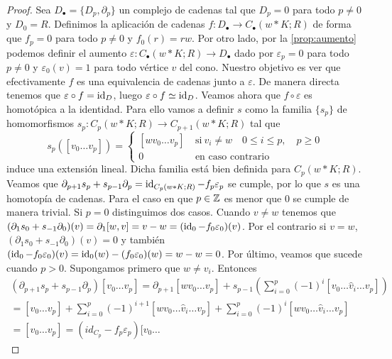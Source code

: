 \begin{proof}
	Sea \(D_{\bullet}= \{D_{p}, \partial_{p}\}\) un complejo de cadenas tal que \(D_{p}
	= 0\) para todo \(p \neq 0\) y \(D_{0}= R\). Definimos la aplicación de cadenas
	\(f: D_{\bullet}\to C_{\bullet}(w \ast K;R)\) de forma que \(f_{p}= 0\) para todo
	\(p \neq 0\) y \(f_{0}(r)=rw\). Por otro lado, por la \autoref{prop:aumento}
	podemos definir el aumento
	\(\varepsilon: C_{\bullet}(w \ast K;R) \to D_{\bullet}\) dado por
	\(\varepsilon_{p}=0\) para todo \(p \neq 0\) y \(\varepsilon_{0}(v) = 1\) para todo
	vértice \(v\) del cono. Nuestro objetivo es ver que efectivamente \(f\) es una equivalencia
	de cadenas junto a \(\varepsilon\). De manera directa tenemos que
	\(\varepsilon \circ f = \operatorname{id}_{D}\), luego \(\varepsilon \circ f \simeq \operatorname{id}_{D}\).
	Veamos ahora que \(f \circ \varepsilon\) es homotópica a la identidad. Para ello
	vamos a definir \(s\) como la familia \(\{s_{p}\}\) de homomorfismos \(s_{p}: C_{p}(
	w \ast K;R) \to C_{p+1}(w \ast K;R)\) tal que
	\[
	s_{p}([v_{0}\ldots v_{p}]) =
	\begin{cases}
		[wv_{0}\ldots v_{p}] \  & \text{si}\ v_{i}\neq w \quad 0 \leq i \leq p,\quad p \geq 0 \\
		0 \                     & \text{en caso contrario}
	\end{cases}
	\]
	induce una extensión lineal. Dicha familia está bien definida para
	\(C_{p}(w \ast K;R)\). Veamos que \(\partial_{p+1}s_{p}+ s_{p-1}\partial_{p}= \operatorname{id}_{C_p(w
		\ast K;R)}- f_{p}\varepsilon_{p}\) se cumple, por lo que \(s\) es una homotopía
	de cadenas. Para el caso en que \(p \in \mathbb{Z}\) es menor que \(0\) se cumple de manera
	trivial. Si \(p = 0\) distinguimos dos casos. Cuando \(v \neq w\) tenemos que \((\partial
	_{1}s_{0}+s_{-1}\partial_{0})(v) = \partial_{1}[w,v] = v-w = (\operatorname{id}_{0}- f_{0}\varepsilon
	_{0})(v)\). Por el contrario si \(v = w\), \((\partial_{1}s_{0}+s_{-1}\partial_{0})
	(v) = 0\) y también \((\operatorname{id}_{0}- f_{0}\varepsilon_{0})(v) = \operatorname{id}_{0}(w) - (f_{0}\varepsilon
	_{0})(w) = w - w = 0\). Por último, veamos que sucede cuando \(p > 0\).
	Supongamos primero que \(w \neq v_{i}\). Entonces
	\begin{gather*}
		(\partial_{p+1}s_{p}+ s_{p-1}\partial_{p})[v_{0}\ldots v_{p}] =\partial_{p+1}
		[wv_{0}\ldots v_{p}]+s_{p-1}\left(\sum_{i=0}^{p}(-1)^{i}[v_{0}\ldots\hat{v}_{i}
		\ldots v_{p}]\right) \\ =[v_{0}\ldots v_{p}]+\sum_{i=0}^{p}(-1)^{i+1}[wv_{0}\ldots
		\hat{v}_{i}\ldots v_{p}]+\sum_{i=0}^{p}(-1)^{i}[wv_{0}\ldots\hat{v}_{i}\ldots
		v_{p}] \\ =[v_{0}\ldots v_{p}]=(id_{C_{p}}-f_{p}\varepsilon_{p})[v_{0}\ldots

\end{gather*}
\end{proof}
